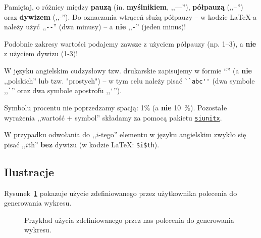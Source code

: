 \documentclass[pdftex,11pt,a4paper]{article}
\newcommand{\PlotROC}[2][1.0]%
{%
	\pgfmathsetmacro{\plotscale}{#1}%
	\newcommand{\filename}{#2}%
}
\begin{document}
\par\bigskip

Pamiętaj, o różnicy między \textbf{pauzą} (in. \textbf{myślnikiem}, ,,---''), \textbf{półpauzą} (,,--'') oraz \textbf{dywizem} (,,-''). Do oznaczania wtrąceń służą półpauzy -- w kodzie \LaTeX-a należy użyć ,,\verb|--|'' (dwa minusy) -- a \textbf{nie} ,,\verb|-|'' (jeden minus)!

\par\smallskip

Podobnie zakresy wartości podajemy zawsze z użyciem półpauzy (np. 1--3), a \textbf{nie} z użyciem dywizu (1-3)!

\par\bigskip

W języku angielskim cudzysłowy tzw. drukarskie zapisujemy w formie ``\textellipsis'' (a \textbf{nie}  ,,polskich'' lub tzw. "prostych") -- w tym celu należy pisać \verb|``abc''| (dwa symbole ,,\verb|`|'' oraz dwa symbole apostrofu ,,\verb|'|'').

\par\bigskip

Symbolu procentu nie poprzedzamy spacją: 1\% (a \textbf{nie} 10~\%). Pozostałe wyrażenia ,,wartość + symbol'' składamy za pomocą pakietu \hyperref[sub:siunitx]{\texttt{siunitx}}.

\par\bigskip


W przypadku odwołania do ,,$i$-tego'' elementu w języku angielskim zwykło się pisać ,,$i$th'' \textbf{bez} dywizu (w kodzie \LaTeX: \lstinline|$i$th|).


\subsection{Ilustracje}
\label{sub:figures}


Rysunek~\ref{fig:plot_generation_custom_command_example} pokazuje użycie zdefiniowanego przez użytkownika polecenia do generowania wykresu.

\begin{figure}[H]
	\centering

	\newcommand{\plotscale}{0.6}
	\PlotROC[\plotscale]{data/roc_plot.csv}
	
	\caption{\label{fig:plot_generation_custom_command_example}Przykład użycia zdefiniowanego przez nas polecenia do generowania wykresu.}
\end{figure}
\end{document}
